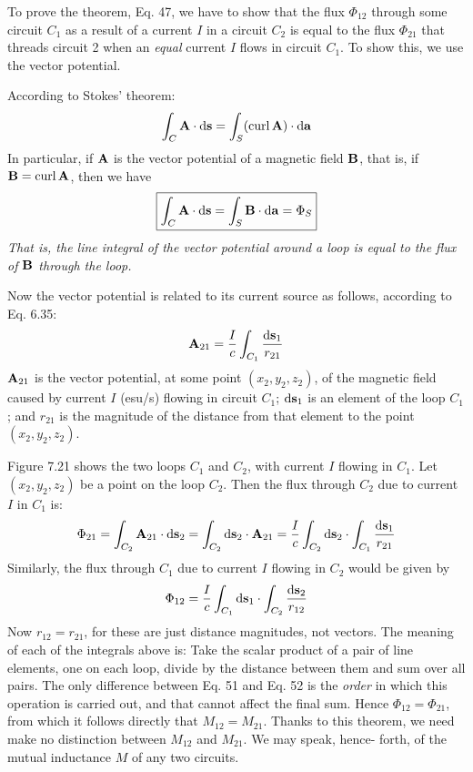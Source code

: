 To prove the theorem, Eq. 47, we have to show that the flux $\Phi_{12}$
through some circuit $C_1$ as a result of a current $I$ in a circuit $C_2$ is
equal to the flux $\Phi_{21}$ that threads circuit 2 when an \emph{equal} current $I$
flows in circuit $C_1$. To show this, we use the vector potential.

According to Stokes' theorem:
\begin{equation}
  \int_C \mathbf{A}\cdot\textup{d}\mathbf{s} = \int_S (\operatorname{curl}\mathbf{A})\cdot\textup{d}\mathbf{a}
\end{equation}
In particular, if $\mathbf{A}$ is the vector potential of a magnetic field $\mathbf{B}$, that is,
if $\mathbf{B} = \operatorname{curl} \mathbf{A}$, then we have
\begin{equation}
\boxed{
  \int_C \mathbf{A}\cdot\textup{d}\mathbf{s} = \int_S \mathbf{B}\cdot\textup{d}\mathbf{a} = \Phi_S
}
\end{equation}
\emph{That is, the line integral of the vector potential around a loop is equal
to the flux of $\mathbf{B}$ through the loop.}

Now the vector potential is related to its current source as follows,
according to Eq. 6.35:
\begin{equation}
  \mathbf{A}_{21} = \frac{I}{c} \int_{C_1} \frac{\textup{d}\mathbf{s}_1}{r_{21}}
\end{equation}
$\mathbf{A}_{21}$ is the vector potential, at some point $(x_2,y_2,z_2)$, of the magnetic
field caused by current $I$ (esu/s) flowing in circuit $C_1$; $\textup{d}\mathbf{s}_1$ is an
element of the loop $C_1$; and $r_{21}$ is the magnitude of the distance from
that element to the point $(x_2,y_2,z_2)$.

Figure 7.21 shows the two loops $C_1$ and $C_2$, with current $I$ flowing
in $C_1$. Let $(x_2,y_2,z_2)$ be a point on the loop $C_2$. Then the flux
through $C_2$ due to current $I$ in $C_1$ is:
\begin{equation}
  \Phi_{21} = \int_{C_2} \mathbf{A}_{21}\cdot\textup{d}\mathbf{s}_2
            = \int_{C_2} \textup{d}\mathbf{s}_2\cdot\mathbf{A}_{21}
            = \frac{I}{c} \int_{C_2} \textup{d}\mathbf{s}_2 \cdot \int_{C_1} \frac{\textup{d}\mathbf{s}_1}{r_{21}}
\end{equation}
Similarly, the flux through $C_1$ due to current $I$ flowing in $C_2$ would
be given by
\begin{equation}
  \Phi_{12} = \frac{I}{c} \int_{C_1} \textup{d}\mathbf{s}_1 \cdot \int_{C_2} \frac{\textup{d}\mathbf{s}_2}{r_{12}}
\end{equation}
Now $r_{12} = r_{21}$, for these are just distance magnitudes, not vectors.
The meaning of each of the integrals above is: Take the scalar product
of a pair of line elements, one on each loop, divide by the distance
between them and sum over all pairs. The only difference between
Eq. 51 and Eq. 52 is the \emph{order} in which this operation is carried out,
and that cannot affect the final sum. Hence $\Phi_{12}=\Phi_{21}$, from which
it follows directly that $M_{12} = M_{21}$. Thanks to this theorem, we need
make no distinction between $M_{12}$ and $M_{21}$. We may speak, hence-
forth, of the mutual inductance $M$ of any two circuits.

